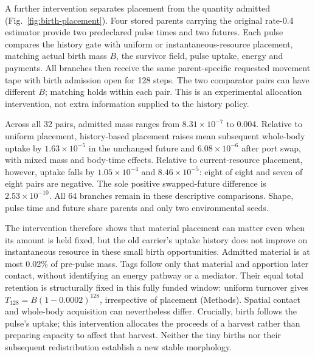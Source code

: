 A further intervention separates placement from the quantity admitted (Fig.~\ref{fig:birth-placement}). Four stored parents carrying the original rate-0.4 estimator provide two predeclared pulse times and two futures. Each pulse compares the history gate with uniform or instantaneous-resource placement, matching actual birth mass $B$, the survivor field, pulse uptake, energy and payments. All branches then receive the same parent-specific requested movement tape with birth admission open for 128 steps. The two comparator pairs can have different $B$; matching holds within each pair. This is an experimental allocation intervention, not extra information supplied to the history policy.

Across all 32 pairs, admitted mass ranges from $8.31\times10^{-7}$ to 0.004. Relative to uniform placement, history-based placement raises mean subsequent whole-body uptake by $1.63\times10^{-5}$ in the unchanged future and $6.08\times10^{-6}$ after port swap, with mixed mass and body-time effects. Relative to current-resource placement, however, uptake falls by $1.05\times10^{-4}$ and $8.46\times10^{-5}$: eight of eight and seven of eight pairs are negative. The sole positive swapped-future difference is $2.53\times10^{-10}$. All 64 branches remain in these descriptive comparisons. Shape, pulse time and future share parents and only two environmental seeds.



The intervention therefore shows that material placement can matter even when its amount is held fixed, but the old carrier's uptake history does not improve on instantaneous resource in these small birth opportunities. Admitted material is at most 0.02\% of pre-pulse mass. Tags follow only that material and apportion later contact, without identifying an energy pathway or a mediator. Their equal total retention is structurally fixed in this fully funded window: uniform turnover gives $T_{128}=B(1-0.0002)^{128}$, irrespective of placement (Methods). Spatial contact and whole-body acquisition can nevertheless differ. Crucially, birth follows the pulse's uptake; this intervention allocates the proceeds of a harvest rather than preparing capacity to affect that harvest. Neither the tiny births nor their subsequent redistribution establish a new stable morphology.

